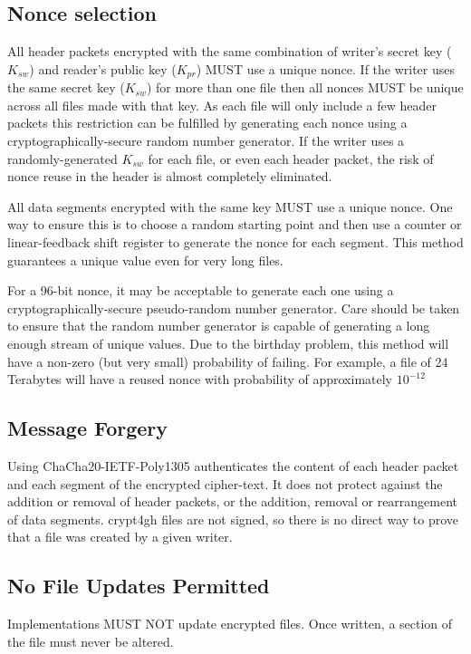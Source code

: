\documentclass[10pt]{article}
\begin{document}
\subsection{Nonce selection}
All header packets encrypted with the same combination of writer's secret key ($K_{sw}$)
and reader's public key ($K_{pr}$) MUST use a unique nonce.
If the writer uses the same secret key ($K_{sw}$) for more than one file then all nonces MUST be unique across all
files made with that key.
As each file will only include a few header packets this restriction can be fulfilled by generating each nonce
using a cryptographically-secure random number generator.
If the writer uses a randomly-generated $K_{sw}$ for each file, or even each header packet, the risk of nonce reuse in
the header is almost completely eliminated.

All data segments encrypted with the same key MUST use a unique nonce.
One way to ensure this is to choose a random starting point and then use a counter or linear-feedback shift
register to generate the nonce for each segment.
This method guarantees a unique value even for very long files.

For a 96-bit nonce, it may be acceptable to generate each one using a cryptographically-secure pseudo-random number
generator.
Care should be taken to ensure that the random number generator is capable of generating a long enough stream
of unique values.
Due to the birthday problem, this method will have a non-zero (but very small) probability of failing.
For example, a file of 24 Terabytes will have a reused nonce with probability of approximately $10^{-12}$

\subsection{Message Forgery}
Using ChaCha20-IETF-Poly1305 authenticates the content of each header packet and each segment of the encrypted
cipher-text.
It does not protect against the addition or removal of header packets, or the addition, removal or rearrangement
of data segments.
crypt4gh files are not signed, so there is no direct way to prove that a file was created by a given writer.

\subsection{No File Updates Permitted}
Implementations MUST NOT update encrypted files.
Once written, a section of the file must never be altered.
\end{document}
